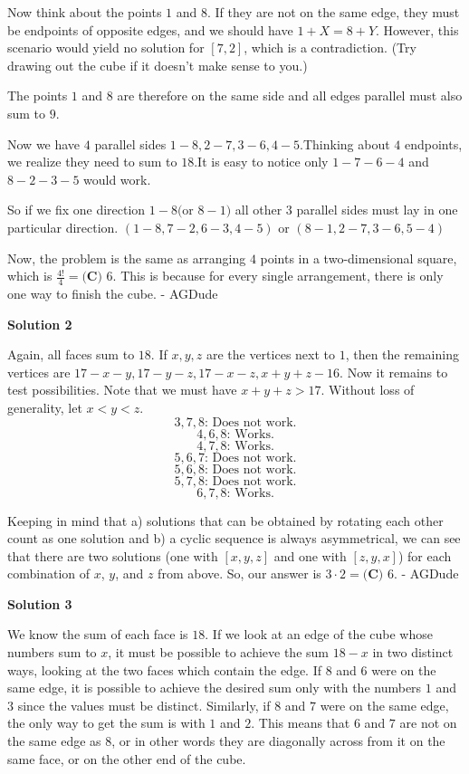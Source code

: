 \begin{enumerate}
 Now think about the points $1$ and $8$. If they are not on the same edge, they must be endpoints of opposite edges, and we should have $1+X=8+Y$. However, this scenario would yield no solution for $[7,2]$, which is a contradiction. (Try drawing out the cube if it doesn't make sense to you.)

 The points $1$ and $8$ are therefore on the same side and all edges parallel must also sum to $9$.

 Now we have $4$ parallel sides $1-8, 2-7, 3-6, 4-5$.Thinking about $4$ endpoints, we realize they need to sum to $18$.It is easy to notice only $1-7-6-4$ and $8-2-3-5$ would work.

 So if we fix one direction $1-8 ($or $8-1)$ all other $3$ parallel sides must lay in one particular direction. $(1-8,7-2,6-3,4-5)$ or $(8-1,2-7,3-6,5-4)$

 Now, the problem is the same as arranging $4$ points in a two-dimensional square, which is $\frac{4!}{4}=\boxed{\textbf{(C) }6.}$ This is because for every single arrangement, there is only one way to finish the cube. - AGDude

 



\textbf{Solution 2}

Again, all faces sum to $18.$ If $x,y,z$ are the vertices next to $1$, then the remaining vertices are $17-x-y, 17-y-z, 17-x-z, x+y+z-16.$ Now it remains to test possibilities. Note that we must have $x+y+z>17.$ Without loss of generality, let $x<y<z.$
 \[3,7,8\text{: Does not work.}\] 
 \[4,6,8\text{: Works.}\]
 \[4,7,8\text{: Works.}\] 
 \[5,6,7\text{: Does not work.}\]
 \[5,6,8\text{: Does not work.}\]
 \[5,7,8\text{: Does not work.}\]
 \[6,7,8\text{: Works.}\]

 Keeping in mind that a) solutions that can be obtained by rotating each other count as one solution and b) a cyclic sequence is always asymmetrical, we can see that there are two solutions (one with $[x, y, z]$ and one with $[z, y, x]$) for each combination of $x$, $y$, and $z$ from above. So, our answer is $3\cdot 2=\boxed{\textbf{(C) }6.}$ - AGDude

 



\textbf{Solution 3}

We know the sum of each face is $18.$ If we look at an edge of the cube whose numbers sum to $x$, it must be possible to achieve the sum $18-x$ in two distinct ways, looking at the two faces which contain the edge. If $8$ and $6$ were on the same edge, it is possible to achieve the desired sum only with the numbers $1$ and $3$ since the values must be distinct. Similarly, if $8$ and $7$ were on the same edge, the only way to get the sum is with $1$ and $2$. This means that $6$ and $7$ are not on the same edge as $8$, or in other words they are diagonally across from it on the same face, or on the other end of the cube.


\end{enumerate}
